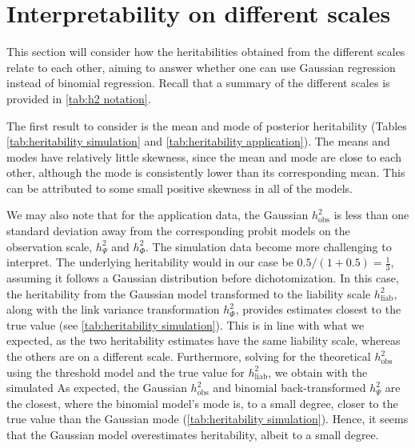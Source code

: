 
\section{Interpretability on different scales}
This section will consider how the heritabilities obtained from the different scales relate to each other, aiming to answer whether one can use Gaussian regression instead of binomial regression. Recall that a summary of the different scales is provided in \autoref{tab:h2 notation}.

The first result to consider is the mean and mode of posterior heritability (Tables \ref{tab:heritability simulation} and \ref{tab:heritability application}). The means and modes have relatively little skewness, since the mean and mode are close to each other, although the mode is consistently lower than its corresponding mean. This can be attributed to some small positive skewness in all of the models.

We may also note that for the application data, the Gaussian $h^2_\text{obs}$ is less than one standard deviation away from the corresponding probit models on the observation scale, $h^2_\Psi$ and $h^2_\Phi$. The simulation data become more challenging to interpret. The underlying heritability would in our case be $0.5/(1+0.5)=\frac13$, assuming it follows a Gaussian distribution before dichotomization. In this case, the heritability from the Gaussian model transformed to the liability scale $h^2_\text{liab}$, along with the link variance transformation $h^2_\Phi$, provides estimates closest to the true value (see \autoref{tab:heritability simulation}). This is in line with what we expected, as the two heritability estimates have the same liability scale, whereas the others are on a different scale. Furthermore, solving for the theoretical $h^2_\text{obs}$ using the threshold model and the true value for $h^2_\text{liab}$, we obtain with the simulated 
As expected, the Gaussian $h^2_\text{obs}$ and binomial back-transformed $h^2_\Psi$ are the closest, where the binomial model's mode is, to a small degree, closer to the true value than the Gaussian mode (\autoref{tab:heritability simulation}). Hence, it seems that the Gaussian model overestimates heritability, albeit to a small degree.

